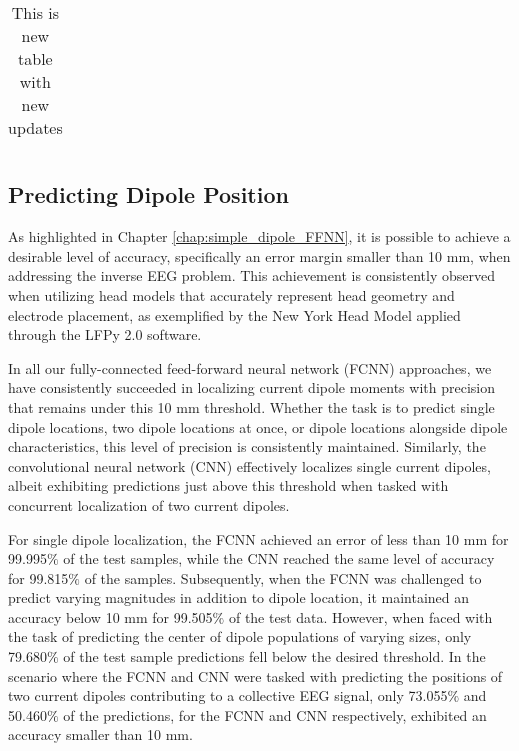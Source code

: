 \documentclass[a4paper, UKenglish, 11pt]{uiomaster}
\begin{document}
\begin{table}[]
\begin{tabular}{c|cccccc|}
\end{tabular}
\caption{This is new table with new updates}
\label{table:sum_main_results}
\end{table}


\subsection{Predicting Dipole Position}


As highlighted in Chapter \ref{chap:simple_dipole_FFNN}, it is possible to achieve a desirable level of accuracy, specifically an error margin smaller than 10 mm, when addressing the inverse EEG problem. This achievement is consistently observed when utilizing head models that accurately represent head geometry and electrode placement, as exemplified by the New York Head Model applied through the LFPy 2.0 software.

In all our fully-connected feed-forward neural network (FCNN) approaches, we have consistently succeeded in localizing current dipole moments with precision that remains under this 10 mm threshold. Whether the task is to predict single dipole locations, two dipole locations at once, or dipole locations alongside dipole characteristics, this level of precision is consistently maintained. Similarly, the convolutional neural network (CNN) effectively localizes single current dipoles, albeit exhibiting predictions just above this threshold when tasked with concurrent localization of two current dipoles.

For single dipole localization, the FCNN achieved an error of less than 10 mm for 99.995$\%$ of the test samples, while the CNN reached the same level of accuracy for 99.815$\%$ of the samples. Subsequently, when the FCNN was challenged to predict varying magnitudes in addition to dipole location, it maintained an accuracy below 10 mm for 99.505$\%$ of the test data. However, when faced with the task of predicting the center of dipole populations of varying sizes, only 79.680$\%$ of the test sample predictions fell below the desired threshold. In the scenario where the FCNN and CNN were tasked with predicting the positions of two current dipoles contributing to a collective EEG signal, only 73.055$\%$ and 50.460$\%$ of the predictions, for the FCNN and CNN respectively, exhibited an accuracy smaller than 10 mm.
\end{document}
